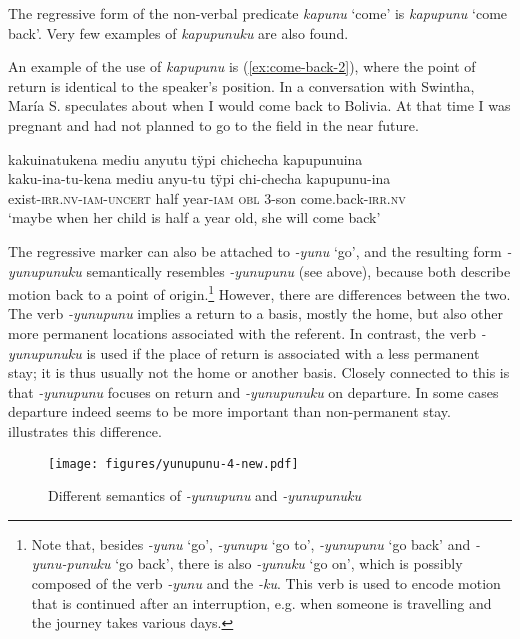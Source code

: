 The regressive form of the non-verbal predicate \textit{kapunu} ‘come’ is \textit{kapupunu} ‘come back’. Very few examples of \textit{kapupunuku} are also found.

An example of the use of \textit{kapupunu} is (\ref{ex:come-back-2}), where the point of return is identical to the speaker’s position. In a conversation with Swintha, María S. speculates about when I would come back to Bolivia. At that time I was pregnant and had not planned to go to the field in the near future.

\ea\label{ex:come-back-2}
\begingl 
\glpreamble kakuinatukena mediu anyutu tÿpi chichecha kapupunuina\\
\gla kaku-ina-tu-kena mediu anyu-tu tÿpi chi-checha kapupunu-ina\\ 
\glb exist-\textsc{irr.nv}-\textsc{iam}-\textsc{uncert} half year-\textsc{iam} \textsc{obl} 3-son come.back-\textsc{irr.nv}\\ 
\glft ‘maybe when her child is half a year old, she will come back’\\ 
\endgl
\trailingcitation{[rxx-e121128s-1.054]}
\xe

The regressive marker can also be attached to \textit{-yunu} ‘go’, and the resulting form \mbox{\textit{-yunupunuku}} semantically resembles \textit{-yunupunu} (see  above), because both describe motion back to a point of origin.\footnote{Note that, besides \textit{-yunu} ‘go’, \textit{-yunupu} ‘go to’, \textit{-yunupunu} ‘go back’ and \textit{-yunu-punuku} ‘go back’, there is also \textit{-yunuku} ‘go on’, which is possibly composed of the verb \textit{-yunu} and the  \textit{-ku}. This verb is used to encode motion that is continued after an interruption, e.g. when someone is travelling and the journey takes various days.}  However, there are differences between the two. The verb \textit{-yunupunu} implies a return to a basis, mostly the home, but also other more permanent locations associated with the referent. In contrast, the verb \textit{-yunupunuku} is used if the place of return is associated with a less permanent stay; it is thus usually not the home or another basis. Closely connected to this is that \textit{-yunupunu} focuses on return and \textit{-yunupunuku} on departure. In some cases departure indeed seems to be more important than non-permanent stay.  illustrates this difference.

\begin{figure}[!ht]

\texttt{[image: figures/yunupunu-4-new.pdf]}
\caption{Different semantics of \textit{-yunupunu} and \textit{-yunupunuku}}
\label{fig:yunupunu}
\end{figure}


